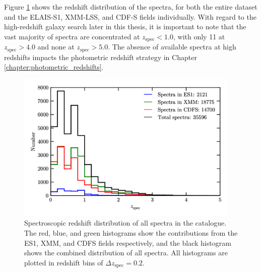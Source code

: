 Figure \ref{fig:spectra} shows the redshift distribution of the \DESVIDEO spectra, for both the entire dataset and the ELAIS-S1, XMM-LSS, and CDF-S fields individually. With regard to the high-redshift galaxy search later in this thesis, it is important to note that the vast majority of spectra are concentrated at $z_{\mathrm{spec}}<1.0$, with only 11 at $z_{\mathrm{spec}}>4.0$ and none at $z_{\mathrm{spec}}>5.0$. The absence of available spectra at high redshifts impacts the photometric redshift strategy in Chapter \ref{chapter:photometric_redshifts}. \par 


\begin{figure}[!htb] 
\centering    
\includegraphics[width=0.95\textwidth]{spectra.png}
\caption[\texorpdfstring{$z_{\mathrm{spec}}$}{} distribution of available spectroscopic redshifts]{Spectroscopic redshift distribution of all spectra in the \DESVIDEO catalogue. The red, blue, and green histograms show the contributions from the ES1, XMM, and CDFS fields respectively, and the black histogram shows the combined distribution of all spectra. All histograms are plotted in redshift bins of $\Delta z_{\mathrm{spec}} = 0.2$.}
\label{fig:spectra}
\end{figure}








